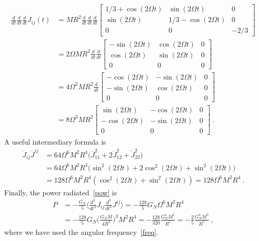 \documentclass[a4paper]{article}
\newcommand{\dv}[2]{\frac{d#1}{d#2}}
\newcommand{\dvt}[2]{\frac{d^3#1}{d#2^3}}
\newcommand{\av}[1]{\langle#1\rangle}
\begin{document}
    \begin{equation*}
    \begin{aligned}
        \dv{}{t} \dv{}{t} \dv{}{t} J_{ij} (t) & = MR^2 \dv{}{t} \dv{}{t} \dv{}{t}  \begin{bmatrix}
            1 / 3 + \cos (2 \Omega t) & \sin (2 \Omega t) & 0 \\
            \sin (2 \Omega t) & 1 / 3 - \cos(2 \Omega t) & 0 \\
            0 & 0 & -2 / 3
        \end{bmatrix} \\ & = 2 \Omega MR^2 \dv{}{t} \dv{}{t}  \begin{bmatrix}
            - \sin (2 \Omega t) & \cos (2 \Omega t) & 0 \\
            \cos (2 \Omega t) & \sin(2 \Omega t) & 0 \\
            0 & 0 & 0
        \end{bmatrix} \\ & = 4 \Omega^2 MR^2  \dv{}{t}  \begin{bmatrix}
            - \cos (2 \Omega t) & - \sin (2 \Omega t) & 0 \\
            - \sin (2 \Omega t) & \cos(2 \Omega t) & 0 \\
            0 & 0 & 0
        \end{bmatrix} \\ & = 8 \Omega^3 MR^2 \begin{bmatrix}
            \sin (2 \Omega t) & - \cos (2 \Omega t) & 0 \\
            - \cos (2 \Omega t) & - \sin(2 \Omega t) & 0 \\
            0 & 0 & 0
        \end{bmatrix} ~.
    \end{aligned}
    \end{equation*}
    A useful intermediary formula is 
    \begin{equation*}
    \begin{aligned}
        \dddot J_{ij} \dddot J^{ij} & = 64 \Omega^6 M^2 R^4 \Big ( \dddot J_{11}^2 + 2 \dddot J_{12}^2 + \dddot J_{22}^2 \Big) \\ & = 64 \Omega^6 M^2 R^4 \Big ( \sin^2 (2 \Omega t) + 2 \cos^2 (2 \Omega t) + \sin^2 (2 \Omega t) \Big) \\ & = 128 \Omega^6 M^2 R^4 (\cos^2 (2 \Omega t) + \sin^2 (2 \Omega t)) = 128 \Omega^6 M^2 R^4 ~.
    \end{aligned}
    \end{equation*}
    Finally, the power radiated~\eqref{pow} is
    \begin{equation}\label{pow2}
    \begin{aligned}
        P & = - \frac{G_N}{5} \av{\dvt{}{t} J_{ij} \dvt{}{t} J^{ij}} = - \frac{128}{5} G_N \Omega^6 M^2 R^4  \\ & = - \frac{128}{5} G_N \Big (\frac{G_N M}{4 R^3} \Big)^3 M^2 R^4 = - \frac{128}{320} \frac{G_N^4 M^5}{R^5} = - \frac{2}{5} \frac{G_N^4 M^5}{R^5} ~,
    \end{aligned}
    \end{equation}
    where we have used the angular frequency~\eqref{freq}. 
\end{document}
